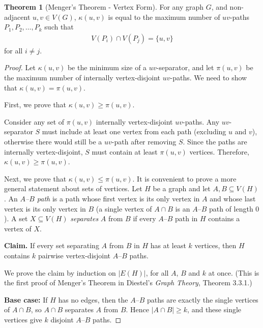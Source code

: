 \documentclass{article}
\theoremstyle{definition}
\newtheorem{theorem}{Theorem}
\begin{document}
\begin{theorem}[Menger's Theorem - Vertex Form]
For any graph $G$, and non-adjacent $u, v \in V(G)$, $\kappa(u,v)$ is equal to the maximum number of $uv$-paths $P_1, P_2, \ldots, P_k$ such that 
\begin{align*}
V(P_i) \cap V(P_j) = \{u, v\}
\end{align*}
for all $i \neq j$.
\end{theorem}

\begin{proof}
Let $\kappa(u,v)$ be the minimum size of a $uv$-separator, and let $\pi(u,v)$ be the maximum number of internally vertex-disjoint $uv$-paths. We need to show that $\kappa(u,v) = \pi(u,v)$.

First, we prove that $\kappa(u,v) \geq \pi(u,v)$. 

Consider any set of $\pi(u,v)$ internally vertex-disjoint $uv$-paths. Any $uv$-separator $S$ must include at least one vertex from each path (excluding $u$ and $v$), otherwise there would still be a $uv$-path after removing $S$. Since the paths are internally vertex-disjoint, $S$ must contain at least $\pi(u,v)$ vertices. Therefore, $\kappa(u,v) \geq \pi(u,v)$.

Next, we prove that $\kappa(u,v) \leq \pi(u,v)$. It is convenient to prove a more general statement about sets of vertices. Let $H$ be a graph and let $A, B \subseteq V(H)$. An \textit{$A$--$B$ path} is a path whose first vertex is its only vertex in $A$ and whose last vertex is its only vertex in $B$ (a single vertex of $A \cap B$ is an $A$--$B$ path of length $0$). A set $X \subseteq V(H)$ \textit{separates} $A$ from $B$ if every $A$--$B$ path in $H$ contains a vertex of $X$.

\textbf{Claim.} If every set separating $A$ from $B$ in $H$ has at least $k$ vertices, then $H$ contains $k$ pairwise vertex-disjoint $A$--$B$ paths.

We prove the claim by induction on $|E(H)|$, for all $A$, $B$ and $k$ at once. (This is the first proof of Menger's Theorem in Diestel's \textit{Graph Theory}, Theorem 3.3.1.)

\textbf{Base case:} If $H$ has no edges, then the $A$--$B$ paths are exactly the single vertices of $A \cap B$, so $A \cap B$ separates $A$ from $B$. Hence $|A \cap B| \geq k$, and these single vertices give $k$ disjoint $A$--$B$ paths.


\end{proof}
\end{document}
